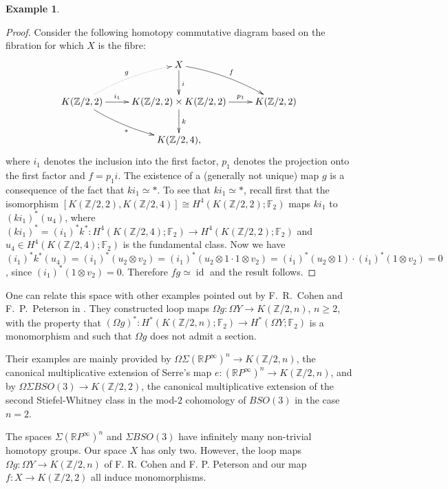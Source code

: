 \documentclass{conm-p-l}
\theoremstyle{definition}
\newtheorem{exmp}[thm]{Example}
\DeclareMathOperator{\id}{id}
\newcommand{\Z}{\mathbb{Z}}
\newcommand{\R}{\mathbb{R}}
\newcommand{\F}{\mathbb{F}}
\renewcommand{\geq}{\geqslant}
\begin{document}
\begin{exmp}
\begin{proof}
Consider the following homotopy commutative diagram based on the fibration for which $X$ is the fibre:
$$\xymatrix{
&X\ar[d]^i\ar@/^/[rd]^f\\
K(\Z/2,2)\ar[r]^-{i_1}\ar@/^/@{.>}[ru]^g\ar@/_/[rd]_{*} &K(\Z/2,2)\times K(\Z/2,2)\ar[r]^-{p_1}\ar[d]^k &K(\Z/2,2)\\
&K(\Z/2,4),
}$$ where $i_1$ denotes the inclusion into the first factor, $p_1$ denotes the projection onto the first factor and $f=p_1i$. The existence of a (generally not unique) map $g$ is a consequence of the fact that $k i_1\simeq*$. To see that $k i_1\simeq*$, recall first that the isomorphism $[K(\Z/2,2),K(\Z/2,4)]\cong H^4(K(\Z/2,2);\F_2)$ maps $ki_1$ to $(ki_1)^*(u_4)$, where $(ki_1)^*=(i_1)^*k^*:H^4(K(\Z/2,4);\F_2)\to H^4(K(\Z/2,2);\F_2)$ and $u_4\in H^4(K(\Z/2,4);\F_2)$ is the fundamental class. Now we have $(i_1)^*k^*(u_4)=(i_1)^*(u_2\otimes v_2)=(i_1)^*(u_2\otimes1\cdot1\otimes v_2)=(i_1)^*(u_2\otimes1)\cdot(i_1)^*(1\otimes v_2)=0$, since $(i_1)^*(1\otimes v_2)=0$. Therefore $fg\simeq \id$ and the result follows.
\end{proof}

\medskip
One can relate this space with other examples pointed out by F.~R.~Cohen and F.~P.~Peterson in \cite{CP00}. They constructed loop maps $\Omega g:\Omega Y\to K(\Z/2,n)$, $n\geq2$, with the property that $(\Omega g)^*:H^*(K(\Z/2,n);\F_2)\to H^*(\Omega Y;\F_2)$ is a monomorphism and such that $\Omega g$ does not admit a section. 

Their examples are mainly provided by $\Omega\Sigma(\R P^\infty)^n\to K(\Z/2,n)$, the canonical multiplicative extension of Serre's map $e:(\R P^\infty)^n\to K(\Z/2,n)$, and by $\Omega\Sigma BSO(3)\to K(\Z/2,2)$, the canonical multiplicative extension of the second Stiefel-Whitney class in the mod-$2$ cohomology of $BSO(3)$ in the case $n=2$.

The spaces $\Sigma(\R P^\infty)^n$ and $\Sigma BSO(3)$ have infinitely many non-trivial homotopy groups. Our space $X$ has only two. However, the loop maps $\Omega g:\Omega Y\to K(\Z/2,n)$ of F. R. Cohen and F. P. Peterson and our map $f:X\to K(\Z/2,2)$ all induce monomorphisms.
\end{exmp}
\end{document}
